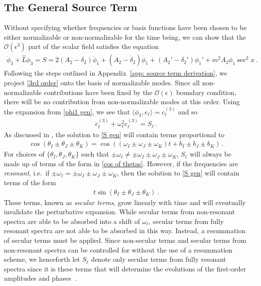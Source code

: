 \documentclass[letterpaper,11pt]{article}
\newcommand{\ol}{\omega_\ell}
\newcommand{\mc}{\mathcal}
\begin{document}
\subsection{The General Source Term}

Without specifying whether frequencies or basis functions have been chosen to be either normalizable or non-normalizable for the time being, we can show that the $\mc O(\epsilon^3)$ part of the scalar field satisfies the equation
\begin{align}
\label{3rd order}
\ddot \phi_3 + \hat L \phi_3 = S = 2 (A_2 - \delta_2) \ddot \phi_1 + (\dot A_2 - \dot \delta_2) \dot\phi_1 + (A_2' -\delta_2' )\phi_1' + m^2 A_2 \phi_1 \sec^2 x \, .
\end{align}
Following the steps outlined in Appendix~\ref{app: source term derivation}, we project \eqref{3rd order} onto the basis of normalizable modes. Since all non-normalizable contributions have been fixed by the $\mc O(\epsilon)$ boundary condition, there will be no contribution from non-normalizable modes at this order. Using the expansion from \eqref{phi1 gen}, we see that ${\langle \phi_3, e_\ell \rangle = c^{(3)}_\ell}$ and so
\begin{align}
\label{S gen}
\ddot c^{(3)}_\ell  + \ol^2 c^{(3)}_\ell = S_\ell \, .
\end{align}
As discussed in \cite{1407.6273}, the solution to \eqref{S gen} will contain terms proportional to 
\begin{align}
\label{cos of thetas}
\cos ( \theta_I \pm \theta_J \pm \theta_K) = \cos \left( (\omega_I \pm \omega_J \pm \omega_K) t + b_I \pm b_J \pm b_K \right) \, .
\end{align}
For choices of $\{\theta_I,\theta_J,\theta_K\}$ such that ${\pm \omega_\ell \neq \pm \omega_I \pm \omega_J \pm \omega_K}$, $S_\ell$ will always be made up of terms of the form in \eqref{cos of thetas}. However, if the frequencies are \emph{resonant}, i.e.~if ${\pm \omega_\ell = \pm \omega_I \pm \omega_J \pm \omega_K}$, then the solution to \eqref{S gen} will contain terms of the form
\begin{align}
\label{secular}
t \sin ( \theta_I \pm \theta_J \pm \theta_K ) \, .
\end{align}
These terms, known as \emph{secular terms}, grow linearly with time and will eventually invalidate the perturbative expansion. While secular terms from non-resonant spectra are able to be absorbed into a shift of $\omega_\ell$, secular terms from fully resonant spectra are not able to be absorbed in this way. Instead, a resummation of secular terms must be applied. Since non-secular terms and secular terms from non-resonant spectra can be controlled for without the use of a resummation scheme, we henceforth let $S_\ell$ denote only secular terms from fully resonant spectra since it is these terms that will determine the evolutions of the first-order amplitudes and phases~\cite{hep-th/9506161}. 
\end{document}
